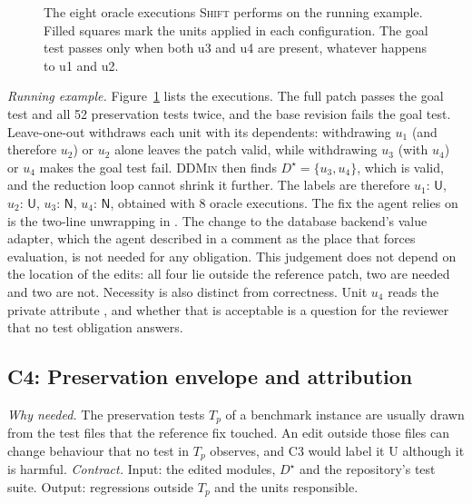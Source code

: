 \documentclass[a4paper,fleqn]{cas-sc}
\newcommand{\tool}{\textsc{Shift}}
\newcommand{\code}[1]{\texttt{\detokenize{#1}}}
\newcommand{\lab}[1]{\textsf{#1}}
\newcommand{\exOracleCalls}{8}
\begin{document}
\begin{figure}[pos=htbp]
\caption{The eight oracle executions \tool{} performs on the running example. Filled squares mark the units applied in each configuration. The goal test passes only when both u3 and u4 are present, whatever happens to u1 and u2.}
\label{fig:search}
\end{figure}

\emph{Running example.} Figure~\ref{fig:search} lists the executions. The full patch passes the goal test and all 52 preservation tests twice, and the base revision fails the goal test. Leave-one-out withdraws each unit with its dependents: withdrawing $u_1$ (and therefore $u_2$) or $u_2$ alone leaves the patch valid, while withdrawing $u_3$ (with $u_4$) or $u_4$ makes the goal test fail. \textsc{DDMin} then finds $D^\star=\{u_3,u_4\}$, which is valid, and the reduction loop cannot shrink it further. The labels are therefore $u_1{:}\,\lab{U}$, $u_2{:}\,\lab{U}$, $u_3{:}\,\lab{N}$, $u_4{:}\,\lab{N}$, obtained with \exOracleCalls{} oracle executions. The fix the agent relies on is the two-line unwrapping in \code{Field.get_prep_value}. The change to the database backend's value adapter, which the agent described in a comment as the place that forces evaluation, is not needed for any obligation. This judgement does not depend on the location of the edits: all four lie outside the reference patch, two are needed and two are not. Necessity is also distinct from correctness. Unit $u_4$ reads the private attribute \code{_wrapped}, and whether that is acceptable is a question for the reviewer that no test obligation answers.


\subsection{C4: Preservation envelope and attribution}\label{sec:envelope}
\emph{Why needed.} The preservation tests $T_p$ of a benchmark instance are usually drawn from the test files that the reference fix touched. An edit outside those files can change behaviour that no test in $T_p$ observes, and C3 would label it \lab{U} although it is harmful. \emph{Contract.} Input: the edited modules, $D^\star$ and the repository's test suite. Output: regressions outside $T_p$ and the units responsible.
\end{document}
